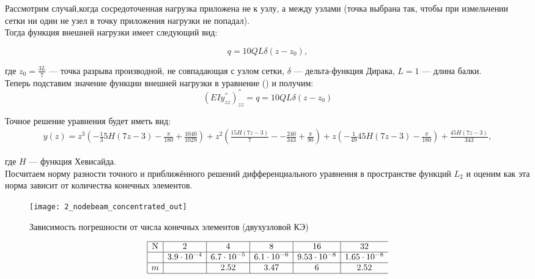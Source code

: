 \documentclass[12pt,a4paper]{article}
\begin{document}
Рассмотрим случай,когда сосредоточенная нагрузка приложена не к узлу, а между узлами (точка выбрана так, чтобы при измельчении сетки ни один не узел в точку приложения нагрузки не попадал).  \\

Тогда функция внешней нагрузки имеет следующий вид:

$$q = 10 Q L  \delta (z - z_{0}),$$

где $z_{0}=\frac{3L}{7}$ --- точка разрыва производной, не совпадающая с узлом сетки, $\delta$ --- дельта-функция Дирака, $L=1$ --- длина балки. \\

Теперь подставим значение функции внешней нагрузки в уравнение () и получим:\\

\[
(EIy^{''}_{zz})^{''}_{zz} = q = 10 Q L  \delta (z - z_{0})
\]

Точное решение уравнения будет иметь вид:
\begin{multline}
	y(z)= z^3 \left(-\frac{1}{3} 5 H (7 z-3)-\frac{\pi }{180}+\frac{1040}{1029}\right)+z^2 \left(\frac{15 H (7 z-3)}{7}-
-\frac{240}{343}+\frac{\pi }{90}\right) {}
+z \left(-\frac{1}{49} 45 H (7 z-3)-\frac{\pi }{180}\right)+\frac{45 H (7 z-3)}{343},
\end{multline}

где $H$ --- функция Хевисайда.\\

Посчитаем норму разности точного и приближённого решений дифференциального уравнения в пространстве функций $L_{2}$  и оценим как эта норма зависит от количества конечных элементов.\\

\begin{figure}[H]
		\centering
		\texttt{[image: 2\_nodebeam\_concentrated\_out]}
		\caption{Зависимость погрешности от числа конечных элементов (двухузловой КЭ)}
		\label{fig:2_nodebeam_concentrated_out}
	\end{figure}

\[
\begin{array}{|c|c|c|c|c|c}
\hline
\text{N} & 2 & 4 & 8 & 16 & 32\\ \hline
\Delta  &3.9 \cdot 10^{-4} & 6.7 \cdot 10^{-5} & 6.1 \cdot 10^{-6} & 9.53 \cdot 10^{-8} & 1.65 \cdot 10^{-8} \\ \hline
m  &  & 2.52 & 3.47 & 6 & 2.52 \\ 
\hline
\end{array}
\]
\end{document}
